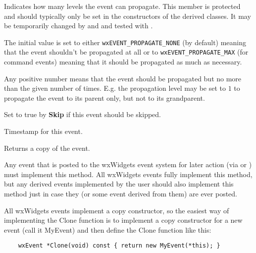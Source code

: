
Indicates how many levels the event can propagate. This member is protected and
should typically only be set in the constructors of the derived classes. It
may be temporarily changed by  
and  and tested with 
.

The initial value is set to either {\tt wxEVENT\_PROPAGATE\_NONE} (by
default) meaning that the event shouldn't be propagated at all or to 
{\tt wxEVENT\_PROPAGATE\_MAX} (for command events) meaning that it should be
propagated as much as necessary.

Any positive number means that the event should be propagated but no more than
the given number of times. E.g. the propagation level may be set to $1$ to
propagate the event to its parent only, but not to its grandparent.

\label{wxeventmskipped}


Set to true by {\bf Skip} if this event should be skipped.

\label{wxeventmtimestamp}


Timestamp for this event.

\label{wxeventclone}


Returns a copy of the event.

Any event that is posted to the wxWidgets event system for later action (via
 or
) must implement this method. All wxWidgets
events fully implement this method, but any derived events implemented by the
user should also implement this method just in case they (or some event
derived from them) are ever posted.

All wxWidgets events implement a copy constructor, so the easiest way of
implementing the Clone function is to implement a copy constructor for
a new event (call it MyEvent) and then define the Clone function like this:

\begin{verbatim}
    wxEvent *Clone(void) const { return new MyEvent(*this); }
\end{verbatim}

